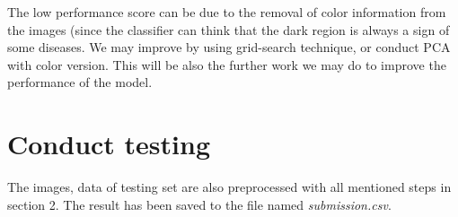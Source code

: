 \documentclass[12pt, a4paper]{article}
\begin{document}
	The low performance score can be due to the removal of color information from the images (since the classifier can think that the dark region is always a sign of some diseases. We may improve by using grid-search technique, or conduct PCA with color version. This will be also the further work we may do to improve the performance of the model.
	
	\section{Conduct testing}
	
	The images, data of testing set are also preprocessed with all mentioned steps in section 2. The result has been saved to the file named \emph{submission.csv}.
	
	\newpage
	
	\printbibliography
	
\end{document}
